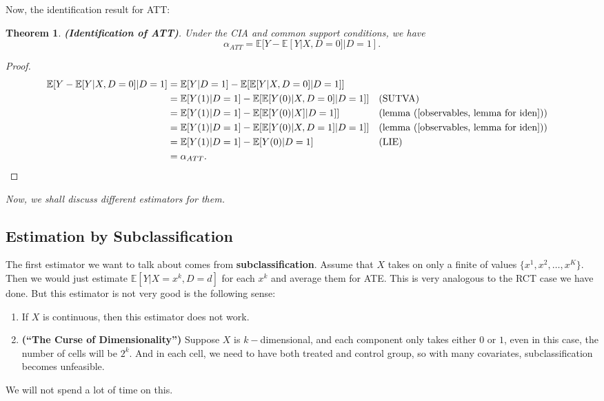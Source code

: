 \documentclass[11pt,a4paper]{amsart}
\theoremstyle{plain}
\newtheorem{theorem}{Theorem}
\theoremstyle{definition}
\begin{document}
	Now, the identification result for ATT:
	\begin{theorem}
			\textbf{(Identiﬁcation of ATT)}. Under the CIA and common support conditions, we have 
			\[	\alpha_{A T T} = \mathbb{E}[Y-\mathbb{E}[Y|X, D=0]|D=1].	\]
	\end{theorem}
	\begin{proof}
		\[	\begin{aligned}
			 \mathbb{E}[Y-\mathbb{E}[Y|X, D=0]|D=1] 	&=  \mathbb{E}[Y|D=1]- \mathbb{E}[\mathbb{E}[Y|X, D=0]|D=1]] \\
			&=  \mathbb{E}[Y(1)|D=1]- \mathbb{E}[\mathbb{E}[Y(0)|X, D=0]|D=1]] &&\text{(SUTVA)}	\\
			&= \mathbb{E}[Y(1)|D=1]- \mathbb{E}[\mathbb{E}[Y(0)|X]|D=1]] &&\text{(lemma (\ref{observables, lemma for iden}))}	\\
			&=  \mathbb{E}[Y(1)|D=1]-\mathbb{E}[\mathbb{E}[Y(0)|X,D=1]|D=1]] &&\text{(lemma (\ref{observables, lemma for iden}))}\\
			&= \mathbb{E}[Y(1)|D=1] - \mathbb{E}[Y(0)|D=1] &&\text{(LIE)} \\
			&= \alpha_{ATT}.
		\end{aligned}	\]
	\end{proof}
	\vspace{5pt}
	\emph{Now, we shall discuss different estimators for them.}
	
\subsection{Estimation by Subclassiﬁcation}\hfill\par 
	The first estimator we want to talk about comes from \textbf{subclassification}. Assume that $X$ takes on only a finite of values $\{x^{1}, x^{2}, \dots, x^{K}\}$. Then we would just estimate $\mathbb{E}[Y|X=x^{k}, D=d]$ for each $x^{k}$ and average them for ATE. This is very analogous to the RCT case we have done. But this estimator is not very good is the following sense:
	\begin{enumerate}
		\item If $X$ is continuous, then this estimator does not work.
		\item \textbf{(“The Curse of Dimensionality”)} Suppose $X$ is $k-$dimensional, and each component only takes either $0$ or $1$, even in this case, the number of cells will be $2^{k}$. And in each cell, we need to have both treated and control group, so with many covariates, subclassiﬁcation becomes unfeasible.
	\end{enumerate}
	We will not spend a lot of time on this. 
	
\end{document}
